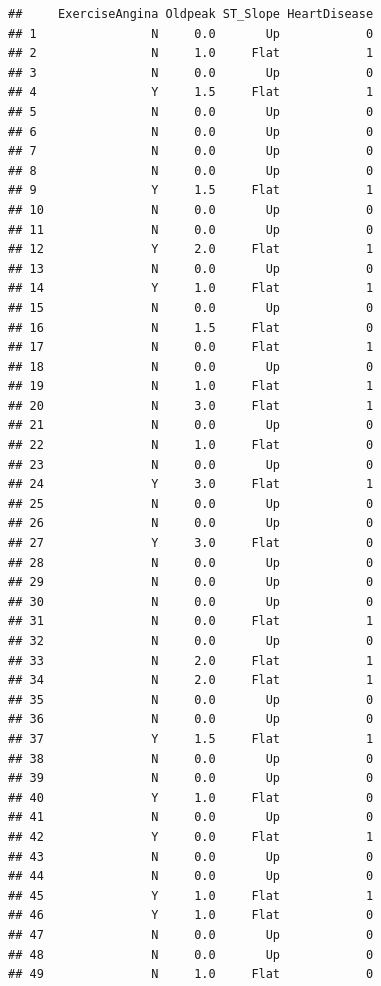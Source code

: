 \documentclass[
]{article}
\begin{document}
\begin{verbatim}
##     ExerciseAngina Oldpeak ST_Slope HeartDisease
## 1                N     0.0       Up            0
## 2                N     1.0     Flat            1
## 3                N     0.0       Up            0
## 4                Y     1.5     Flat            1
## 5                N     0.0       Up            0
## 6                N     0.0       Up            0
## 7                N     0.0       Up            0
## 8                N     0.0       Up            0
## 9                Y     1.5     Flat            1
## 10               N     0.0       Up            0
## 11               N     0.0       Up            0
## 12               Y     2.0     Flat            1
## 13               N     0.0       Up            0
## 14               Y     1.0     Flat            1
## 15               N     0.0       Up            0
## 16               N     1.5     Flat            0
## 17               N     0.0     Flat            1
## 18               N     0.0       Up            0
## 19               N     1.0     Flat            1
## 20               N     3.0     Flat            1
## 21               N     0.0       Up            0
## 22               N     1.0     Flat            0
## 23               N     0.0       Up            0
## 24               Y     3.0     Flat            1
## 25               N     0.0       Up            0
## 26               N     0.0       Up            0
## 27               Y     3.0     Flat            0
## 28               N     0.0       Up            0
## 29               N     0.0       Up            0
## 30               N     0.0       Up            0
## 31               N     0.0     Flat            1
## 32               N     0.0       Up            0
## 33               N     2.0     Flat            1
## 34               N     2.0     Flat            1
## 35               N     0.0       Up            0
## 36               N     0.0       Up            0
## 37               Y     1.5     Flat            1
## 38               N     0.0       Up            0
## 39               N     0.0       Up            0
## 40               Y     1.0     Flat            0
## 41               N     0.0       Up            0
## 42               Y     0.0     Flat            1
## 43               N     0.0       Up            0
## 44               N     0.0       Up            0
## 45               Y     1.0     Flat            1
## 46               Y     1.0     Flat            0
## 47               N     0.0       Up            0
## 48               N     0.0       Up            0
## 49               N     1.0     Flat            0

\end{verbatim}
\end{document}
